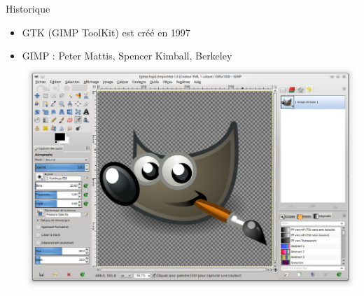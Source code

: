 \documentclass{beamer}
\begin{document}
\begin{frame}{Historique}
  \begin{itemize}
  	\item GTK (GIMP ToolKit) est créé en 1997
    \item GIMP : Peter Mattis, Spencer Kimball, Berkeley \includegraphics[scale=0.2]{Pictures/gimp.png} 
   \end{itemize}
\end{frame}
\end{document}
